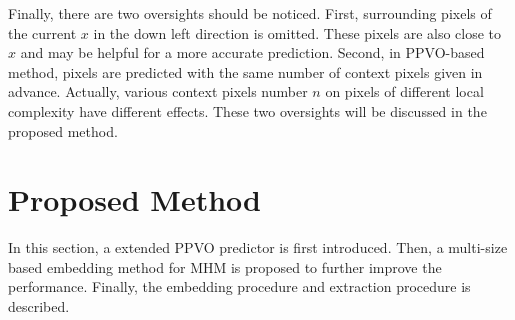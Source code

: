 \documentclass[review,3p,10pt,sort&compress]{elsarticle}
\begin{document}
Finally, there are two oversights should be noticed. First, surrounding pixels of the current $x$ in the down left direction is omitted. These pixels are also close to $x$ and may be helpful for a more accurate prediction. Second, in PPVO-based method, pixels are predicted with the same number of context pixels given in advance. Actually, various context pixels number $n$ on pixels of different local complexity have different effects. These two oversights will be discussed in the proposed method.


\section{Proposed Method}\label{sec:3}
In this section, a extended PPVO predictor is first introduced. Then, a multi-size based embedding method for MHM is proposed to further improve the performance. Finally, the embedding procedure and extraction procedure is described.
\end{document}
